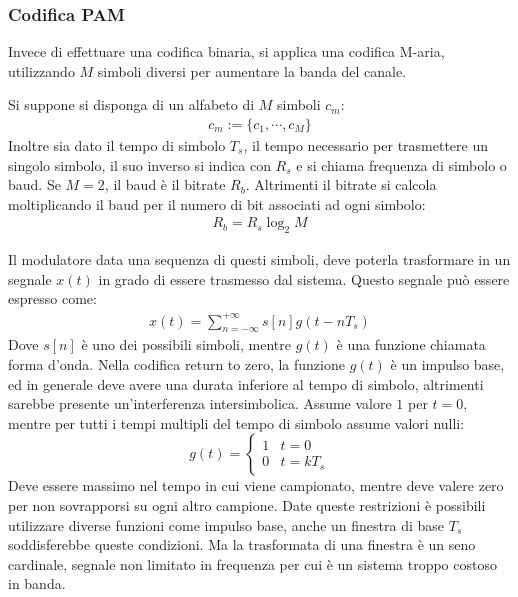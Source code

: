 \documentclass{article}
\numberwithin{equation}{subsection}
\begin{document}
\subsubsection{Codifica PAM}

Invece di effettuare una codifica binaria, si applica una codifica M-aria, utilizzando $M$ simboli diversi per aumentare la banda del canale. 

Si suppone si disponga di un alfabeto di $M$ simboli $c_m$:
\begin{gather*}
    c_m:=\biggl\{c_1,\cdots,c_M\biggr\}
\end{gather*}
Inoltre sia dato il tempo di simbolo $T_s$, il tempo necessario per trasmettere un singolo simbolo, il suo inverso si indica con $R_s$ e si chiama frequenza di simbolo o 
baud. Se $M=2$, il baud è il bitrate $R_b$. Altrimenti il bitrate si calcola moltiplicando il baud per il numero di bit associati ad ogni simbolo:
\begin{gather*}
    R_b=R_s\log_{2}M
\end{gather*}

Il modulatore data una sequenza di questi simboli, deve poterla trasformare in un segnale $x(t)$ in grado di essere trasmesso dal sistema. 
Questo segnale può essere espresso come:
\begin{gather}
    x(t)=\displaystyle\sum_{n=-\infty}^{+\infty}s[n]g(t-nT_s)
\end{gather}
Dove $s[n]$ è uno dei possibili simboli, mentre $g(t)$ è una funzione chiamata forma d'onda. 
Nella codifica return to zero, la funzione $g(t)$ è un impulso base, ed in generale deve avere una durata inferiore al tempo di simbolo, altrimenti sarebbe presente un'interferenza 
intersimbolica. Assume valore $1$ per $t=0$, mentre per tutti i tempi multipli del tempo di simbolo assume valori nulli:
\begin{equation}
    g(t)=\begin{cases}
        1&t=0\\
        0&t=kT_s
    \end{cases}
\end{equation}
Deve essere massimo nel tempo in cui viene campionato, mentre deve valere zero per non sovrapporsi su ogni altro campione. Date queste restrizioni è possibili utilizzare 
diverse funzioni come impulso base, anche un finestra di base $T_s$ soddisferebbe queste condizioni. Ma la trasformata di una finestra è un seno cardinale, 
segnale non limitato in frequenza per cui è un sistema troppo costoso in banda. 
\end{document}
